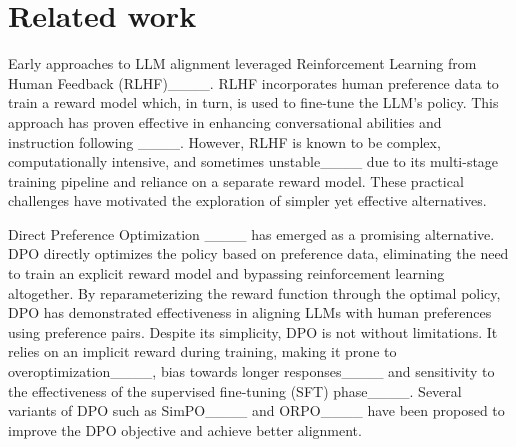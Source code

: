 \section{Related work}


Early approaches to LLM alignment leveraged Reinforcement Learning from Human Feedback (RLHF)____. RLHF incorporates human preference data to train a reward model which, in turn, is used to fine-tune the LLM's policy. This approach has proven effective in enhancing conversational abilities and instruction following ____. However, RLHF is known to be complex, computationally intensive, and sometimes unstable____ due to its multi-stage training pipeline and reliance on a separate reward model. These practical challenges have motivated the exploration of simpler yet effective alternatives.

Direct Preference Optimization ____ has emerged as a promising alternative. DPO directly optimizes the policy based on preference data, eliminating the need to train an explicit reward model and bypassing reinforcement learning altogether. By reparameterizing the reward function through the optimal policy, DPO has demonstrated effectiveness in aligning LLMs with human preferences using preference pairs. Despite its simplicity, DPO is not without limitations. It relies on an implicit reward during training, making it prone to overoptimization____, bias towards longer responses____ and sensitivity to the effectiveness of the supervised fine-tuning (SFT) phase____. Several variants of DPO such as SimPO____ and ORPO____ have been proposed to improve the DPO objective and achieve better alignment.

